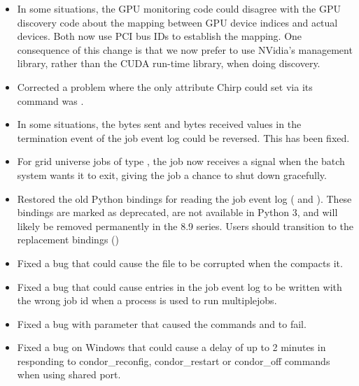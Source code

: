 \begin{itemize}

\item In some situations, the GPU monitoring code could disagree with the
GPU discovery code about the mapping between GPU device indices and actual
devices.  Both now use PCI bus IDs to establish the mapping.  One consequence
of this change is that we now prefer to use NVidia's management library,
rather than the CUDA run-time library, when doing discovery.

\item Corrected a problem where the only attribute Chirp could
set via its  command was .

\item In some situations, the bytes sent and bytes received values in
the termination event of the job event log could be reversed.
This has been fixed.

\item For grid universe jobs of type , the job now receives a
signal when the batch system wants it to exit, giving the job a chance to
shut down gracefully.

\item Restored the old Python bindings for reading the job event log
( and ).
These bindings are marked as deprecated, are not available in
Python 3, and will likely be removed permanently in the 8.9 series.
Users should transition to the replacement bindings ()

\item Fixed a bug that could cause the  file to
be corrupted when the  compacts it.

\item Fixed a bug that could cause entries in the job event log to be
written with the wrong job id when a  process is used to
run multiplejobs.

\item Fixed a bug with parameter 
that caused the  commands  and 
 to fail.

\item Fixed a bug on Windows that could cause a delay of up to 2 minutes in responding
to condor\_reconfig, condor\_restart or condor\_off commands when using shared port.


\end{itemize}

